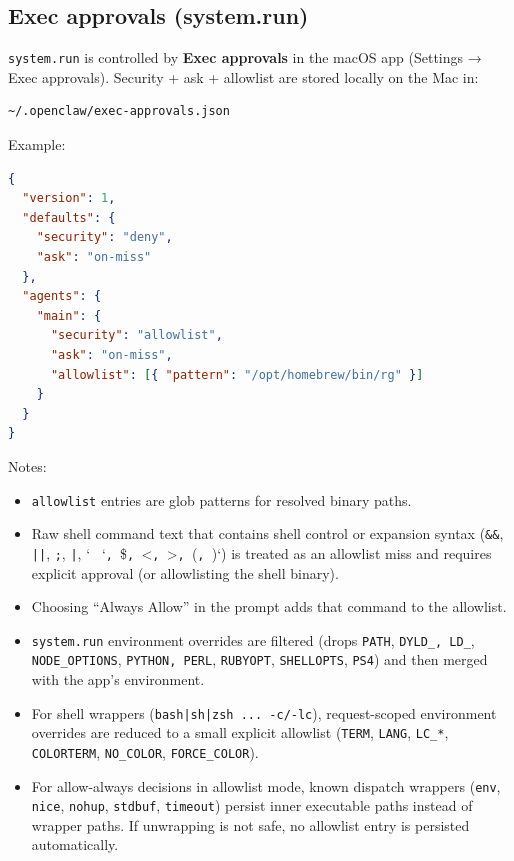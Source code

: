\subsection{Exec approvals (system.run)}


\texttt{system.run} is controlled by \textbf{Exec approvals} in the macOS app (Settings → Exec approvals).
Security + ask + allowlist are stored locally on the Mac in:

\begin{lstlisting}
~/.openclaw/exec-approvals.json
\end{lstlisting}


Example:

\begin{lstlisting}[language=json]
{
  "version": 1,
  "defaults": {
    "security": "deny",
    "ask": "on-miss"
  },
  "agents": {
    "main": {
      "security": "allowlist",
      "ask": "on-miss",
      "allowlist": [{ "pattern": "/opt/homebrew/bin/rg" }]
    }
  }
}
\end{lstlisting}


Notes:

\begin{itemize}
  \item \texttt{allowlist} entries are glob patterns for resolved binary paths.
  \item Raw shell command text that contains shell control or expansion syntax (\texttt{\&\&}, \texttt{||}, \texttt{;}, \texttt{|}, `\texttt{ } `\texttt{, }\$\texttt{, }<\texttt{, }>\texttt{, }(\texttt{, })`) is treated as an allowlist miss and requires explicit approval (or allowlisting the shell binary).
  \item Choosing “Always Allow” in the prompt adds that command to the allowlist.
  \item \texttt{system.run} environment overrides are filtered (drops \texttt{PATH}, \texttt{DYLD\_\textit{}, \texttt{LD\_}}, \texttt{NODE\_OPTIONS}, \texttt{PYTHON\textit{}, \texttt{PERL}}, \texttt{RUBYOPT}, \texttt{SHELLOPTS}, \texttt{PS4}) and then merged with the app’s environment.
  \item For shell wrappers (\texttt{bash|sh|zsh ... -c/-lc}), request-scoped environment overrides are reduced to a small explicit allowlist (\texttt{TERM}, \texttt{LANG}, \texttt{LC\_*}, \texttt{COLORTERM}, \texttt{NO\_COLOR}, \texttt{FORCE\_COLOR}).
  \item For allow-always decisions in allowlist mode, known dispatch wrappers (\texttt{env}, \texttt{nice}, \texttt{nohup}, \texttt{stdbuf}, \texttt{timeout}) persist inner executable paths instead of wrapper paths. If unwrapping is not safe, no allowlist entry is persisted automatically.
\end{itemize}


